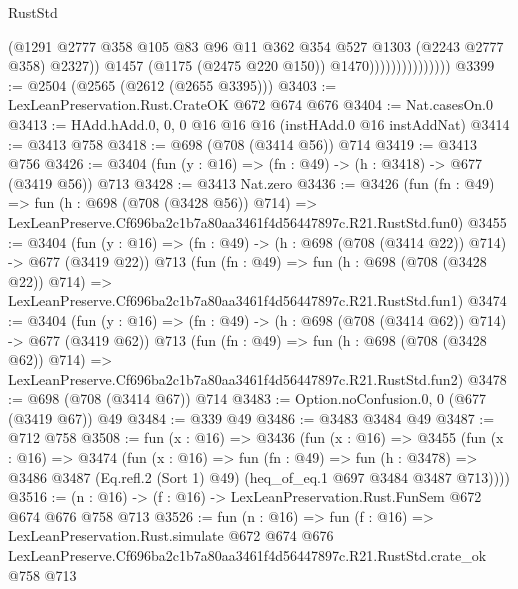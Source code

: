 \begin{lexlean}{RustStd}
\begin{coremodule}
                                    (@1291
                                      @2777
                                      @358
                                      @105
                                      @83
                                      @96
                                      @11
                                      @362
                                      @354
                                      @527
                                      @1303
                                      (@2243 @2777 @358)
                                      @2327))
                                  @1457
                                  (@1175 (@2475 @220 @150))
                                  @1470)))))))))))))))
@3399 := @2504 (@2565 (@2612 (@2655 @3395)))
@3403 := LexLeanPreservation.Rust.CrateOK @672 @674 @676
@3404 := Nat.casesOn.{0}
@3413 := HAdd.hAdd.{0, 0, 0} @16 @16 @16 (instHAdd.{0} @16 instAddNat)
@3414 := @3413 @758
@3418 := @698 (@708 (@3414 @56)) @714
@3419 := @3413 @756
@3426 := @3404 (fun (y : @16) => (fn : @49) -> (h : @3418) -> @677 (@3419 @56)) @713
@3428 := @3413 Nat.zero
@3436 := @3426
    (fun (fn : @49) =>
    fun (h : @698 (@708 (@3428 @56)) @714) =>
    LexLeanPreserve.Cf696ba2c1b7a80aa3461f4d56447897c.R21.RustStd.fun0)
@3455 := @3404
    (fun (y : @16) => (fn : @49) -> (h : @698 (@708 (@3414 @22)) @714) -> @677 (@3419 @22))
    @713
    (fun (fn : @49) =>
    fun (h : @698 (@708 (@3428 @22)) @714) =>
    LexLeanPreserve.Cf696ba2c1b7a80aa3461f4d56447897c.R21.RustStd.fun1)
@3474 := @3404
    (fun (y : @16) => (fn : @49) -> (h : @698 (@708 (@3414 @62)) @714) -> @677 (@3419 @62))
    @713
    (fun (fn : @49) =>
    fun (h : @698 (@708 (@3428 @62)) @714) =>
    LexLeanPreserve.Cf696ba2c1b7a80aa3461f4d56447897c.R21.RustStd.fun2)
@3478 := @698 (@708 (@3414 @67)) @714
@3483 := Option.noConfusion.{0, 0} (@677 (@3419 @67)) @49
@3484 := @339 @49
@3486 := @3483 @3484 @49
@3487 := @712 @758
@3508 := fun (x : @16) =>
  @3436
    (fun (x : @16) =>
    @3455
      (fun (x : @16) =>
      @3474
        (fun (x : @16) =>
        fun (fn : @49) =>
        fun (h : @3478) =>
        @3486 @3487 (Eq.refl.{2} (Sort 1) @49) (heq_of_eq.{1} @697 @3484 @3487 @713))))
@3516 := (n : @16) -> (f : @16) -> LexLeanPreservation.Rust.FunSem @672 @674 @676 @758 @713
@3526 := fun (n : @16) =>
  fun (f : @16) =>
  LexLeanPreservation.Rust.simulate
    @672
    @674
    @676
    LexLeanPreserve.Cf696ba2c1b7a80aa3461f4d56447897c.R21.RustStd.crate_ok
    @758
    @713
\end{coremodule}
\end{lexlean}
